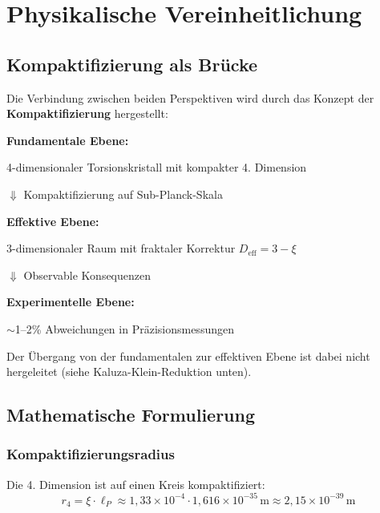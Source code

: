 	\section{Physikalische Vereinheitlichung}
	
	\subsection{Kompaktifizierung als Brücke}
	
	Die Verbindung zwischen beiden Perspektiven wird durch das Konzept der \textbf{Kompaktifizierung} hergestellt:
	
	\begin{keyresult}
		\textbf{Fundamentale Ebene:}
		\begin{center}
			4-dimensionaler Torsionskristall mit kompakter 4. Dimension
		\end{center}
		
		$\Downarrow$ \quad Kompaktifizierung auf Sub-Planck-Skala
		
		\textbf{Effektive Ebene:}
		\begin{center}
			3-dimensionaler Raum mit fraktaler Korrektur $D_{\text{eff}} = 3 - \xi$
		\end{center}
		
		$\Downarrow$ \quad Observable Konsequenzen
		
		\textbf{Experimentelle Ebene:}
		\begin{center}
			$\sim$1--2\% Abweichungen in Präzisionsmessungen
		\end{center}
	\end{keyresult}
	
	Der Übergang von der fundamentalen zur effektiven Ebene ist dabei nicht hergeleitet (siehe Kaluza-Klein-Reduktion unten).
	
	\subsection{Mathematische Formulierung}
	
	\subsubsection{Kompaktifizierungsradius}
	
	Die 4. Dimension ist auf einen Kreis kompaktifiziert:
	\begin{equation}
		\boxed{r_4 = \xi \cdot \ell_P \approx 1{,}33 \times 10^{-4} \cdot 1{,}616 \times 10^{-35}\,\text{m} \approx 2{,}15 \times 10^{-39}\,\text{m}}
	\end{equation}
	
